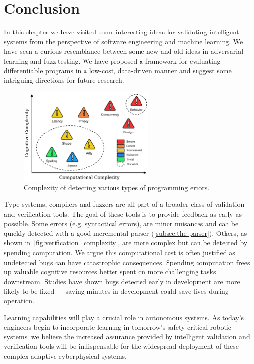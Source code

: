 \section{Conclusion}

In this chapter we have visited some interesting ideas for validating intelligent systems from the perspective of software engineering and machine learning. We have seen a curious resemblance between some new and old ideas in adversarial learning and fuzz testing. We have proposed a framework for evaluating differentiable programs in a low-cost, data-driven manner and suggest some intriguing directions for future research.

\begin{figure}
\centering
\includegraphics[width=0.60\textwidth]{../figures/verification_complexity.png}
\caption{Complexity of detecting various types of programming errors.}
\label{fig:verification_complexity}
\end{figure}

Type systems, compilers and fuzzers are all part of a broader class of validation and verification tools. The goal of these tools is to provide feedback as early as possible. Some errors (e.g. syntactical errors), are minor nuisances and can be quickly detected with a good incremental parser (\autoref{subsec:the-parser}). Others, as shown in~\autoref{fig:verification_complexity}, are more complex but can be detected by spending computation. We argue this computational cost is often justified as undetected bugs can have catastrophic consequences. Spending computation frees up valuable cognitive resources better spent on more challenging tasks downstream. Studies have shown bugs detected early in development are more likely to be fixed~\citep{distefano2019scaling} -- saving minutes in development could save lives during operation.

Learning capabilities will play a crucial role in autonomous systems. As today's engineers begin to incorporate learning in tomorrow's safety-critical robotic systems, we believe the increased assurance provided by intelligent validation and verification tools will be indispensable for the widespread deployment of these complex adaptive cyberphysical systems.

